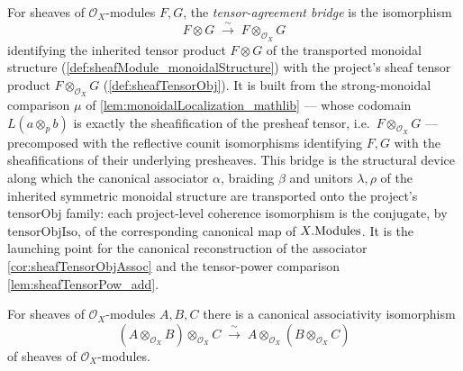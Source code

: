 \begin{definition}\leanok
  \label{def:tensorObjIso}
  For sheaves of \(\mathcal{O}_X\)-modules \(F, G\), the \emph{tensor-agreement
  bridge} is the isomorphism
  \[
    F \otimes G \;\xrightarrow{\ \sim\ }\;
      F \otimes_{\mathcal{O}_X} G
  \]
  identifying the inherited tensor product \(F \otimes G\) of the transported
  monoidal structure (\cref{def:sheafModule_monoidalStructure}) with the project's
  sheaf tensor product \(F \otimes_{\mathcal{O}_X} G\) (\cref{def:sheafTensorObj}).
  It is built from the strong-monoidal comparison \(\mu\) of
  \cref{lem:monoidalLocalization_mathlib} --- whose codomain
  \(L(a \otimes_{p} b)\) is exactly the sheafification of the presheaf tensor, i.e.\
  \(F \otimes_{\mathcal{O}_X} G\) --- precomposed with the reflective counit
  isomorphisms identifying \(F, G\) with the sheafifications of their underlying
  presheaves. This bridge is the structural device along which the canonical
  associator \(\alpha\), braiding \(\beta\) and unitors \(\lambda, \rho\) of the
  inherited symmetric monoidal structure are transported onto the project's
  \(\mathrm{tensorObj}\) family: each project-level coherence isomorphism is the
  conjugate, by \(\mathrm{tensorObjIso}\), of the corresponding canonical map of
  \(X.\mathrm{Modules}\). It is the launching point for the canonical reconstruction of
  the associator \cref{cor:sheafTensorObjAssoc} and the tensor-power comparison
  \cref{lem:sheafTensorPow_add}.
\end{definition}

\begin{corollary}[Associator of the sheaf tensor product]\leanok
  \label{cor:sheafTensorObjAssoc}
  For sheaves of \(\mathcal{O}_X\)-modules \(A, B, C\) there is a canonical
  associativity isomorphism
  \[
    (A \otimes_{\mathcal{O}_X} B) \otimes_{\mathcal{O}_X} C
      \;\xrightarrow{\ \sim\ }\;
      A \otimes_{\mathcal{O}_X} (B \otimes_{\mathcal{O}_X} C)
  \]
  of sheaves of \(\mathcal{O}_X\)-modules.
\end{corollary}

